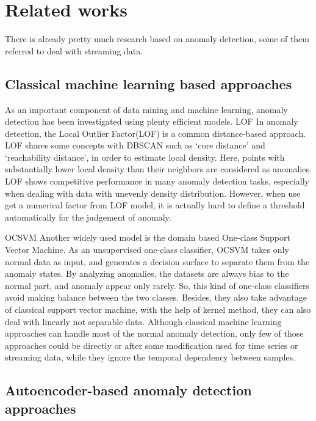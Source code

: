 \chapter{Related works}
\label{chap:related works}

There is already pretty much research based on anomaly detection, some of them referred to deal with streaming data.

\section{Classical machine learning based approaches}
\label{sec:Classical machine learning based approaches}

As an important component of data mining and machine learning, anomaly detection has been investigated using plenty efficient models. 
LOF
In anomaly detection, the Local Outlier Factor(LOF) is a common distance-based approach. LOF shares some concepts with DBSCAN such as ‘core distance’ and ‘reachability distance’, in order to estimate local density. Here, points with substantially lower local density than their neighbors are considered as anomalies. LOF shows competitive performance in many anomaly detection tasks, especially when dealing with data with unevenly density distribution. However, when use get a numerical factor from LOF model, it is actually hard to define a threshold automatically for the judgement of anomaly.

OCSVM
Another widely used model is the domain based One-class Support Vector Machine. As an unsupervised one-class classifier, OCSVM takes only normal data as input, and generates a decision surface to separate them from the anomaly states.  By analyzing anomalies, the datasets are always bias to the normal part, and anomaly appear only rarely. So, this kind of one-class classifiers avoid making balance between the two classes. Besides, they also take advantage of classical support vector machine, with the help of kernel method, they can also deal with linearly not separable data.
Although classical machine learning approaches can handle most of the normal anomaly detection, only few of those approaches could be directly or after some modification used for time series or streaming data, while they ignore the temporal dependency between samples.



\section{Autoencoder-based anomaly detection approaches}
\label{sec:Autoencoder-based anomaly detection approaches}

